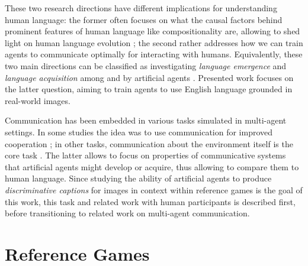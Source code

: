 These two research directions have different implications for understanding human language: the former often focuses on what the causal factors behind prominent features of human language like compositionality are, allowing to shed light on human language evolution \parencite{christiansen2003language, kirby2014iterated}; the second rather addresses how we can train agents to communicate optimally for interacting with humans. Equivalently, these two main directions can be classified as investigating \textit{language emergence} and \textit{language acquisition} among and by artificial agents \parencite{lazaridou2018emergence, lazaridou2020emergent}.
Presented work focuses on the latter question, aiming to train agents to use English language grounded in real-world images.

Communication has been embedded in various tasks simulated in multi-agent settings. In some studies the idea was to use communication for improved cooperation \parencite[e.~g.,][]{foerster2016learning, mordatch2018emergence}; in other tasks, communication about the environment itself is the core task \parencite[e.~g.,][]{lazaridou2018emergence}. The latter allows to focus on properties of communicative systems that artificial agents might develop or acquire, thus allowing to compare them to human language. Since studying the ability of artificial agents to produce \textit{discriminative captions} for images in context within reference games is the goal of this work, this task and related work with human participants is described first, before transitioning to related work on multi-agent communication.


\section{Reference Games}
\label{reference_games}

